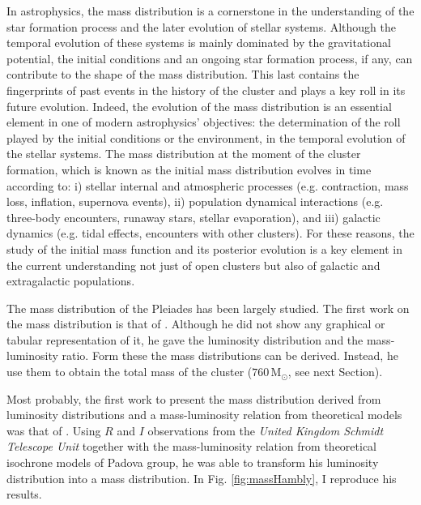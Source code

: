 In astrophysics, the mass distribution is a cornerstone in the understanding of the star formation process and the later evolution of stellar systems. Although the temporal evolution of these systems is mainly dominated by the gravitational potential, the initial conditions and an ongoing star formation process, if any, can contribute to the shape of the mass distribution. This last contains the fingerprints of past events in the history of the cluster and plays a key roll in its future evolution. Indeed, the evolution of the mass distribution is an essential element in one of modern astrophysics' objectives: the determination of the roll played by the initial conditions or the environment, in the temporal evolution of the stellar systems. The mass distribution at the moment of the cluster formation, which is known as the initial mass distribution evolves in time according to: i) stellar internal and atmospheric processes (e.g. contraction, mass loss, inflation, supernova events), ii) population dynamical interactions (e.g. three-body encounters, runaway stars, stellar evaporation), and iii) galactic dynamics (e.g. tidal effects, encounters with other clusters). For these reasons, the study of the initial mass function and its posterior evolution is a key element in the current understanding not just of open clusters but also of galactic and extragalactic populations.  


The mass distribution of the Pleiades has been largely studied. The first work on the mass distribution is that of \citet{Limber1962}. Although he did not show any graphical or tabular representation of it, he gave the luminosity distribution and the mass-luminosity ratio. Form these the mass distributions can be derived. Instead, he use them to obtain the total mass of the cluster ($760\,\mathrm{M_{\odot}}$, see next Section). 

Most probably, the first work to present the mass distribution derived from luminosity distributions and a mass-luminosity relation from theoretical models was that of \citet{Hambly1991}. Using $R$ and $I$ observations from the \emph{United Kingdom Schmidt Telescope Unit} together with the mass-luminosity relation from theoretical isochrone models of Padova group, he was able to transform his luminosity distribution into a mass distribution. In Fig. \ref{fig:massHambly}, I reproduce his results. 


